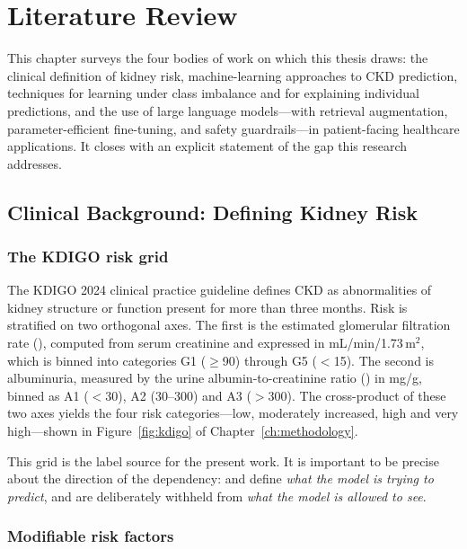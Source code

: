 \chapter{Literature Review}
\label{ch:literature}

This chapter surveys the four bodies of work on which this thesis draws: the
clinical definition of kidney risk, machine-learning approaches to CKD
prediction, techniques for learning under class imbalance and for explaining
individual predictions, and the use of large language models---with retrieval
augmentation, parameter-efficient fine-tuning, and safety guardrails---in
patient-facing healthcare applications. It closes with an explicit statement of
the gap this research addresses.

\section{Clinical Background: Defining Kidney Risk}
\label{sec:clinical}

\subsection{The KDIGO risk grid}

The KDIGO 2024 clinical practice guideline \cite{kdigo2024} defines CKD as
abnormalities of kidney structure or function present for more than three
months. Risk is stratified on two orthogonal axes. The first is the estimated
glomerular filtration rate (\eGFR), computed from serum creatinine and
expressed in mL/min/1.73\,m$^2$, which is binned into categories G1 ($\geq$90)
through G5 ($<$15). The second is albuminuria, measured by the urine
albumin-to-creatinine ratio (\UACR) in mg/g, binned as A1 ($<$30), A2 (30--300)
and A3 ($>$300). The cross-product of these two axes yields the four risk
categories---low, moderately increased, high and very high---shown in
Figure~\ref{fig:kdigo} of Chapter~\ref{ch:methodology}.

This grid is the label source for the present work. It is important to be
precise about the direction of the dependency: \eGFR{} and \UACR{} define
\emph{what the model is trying to predict}, and are deliberately withheld from
\emph{what the model is allowed to see}.

\subsection{Modifiable risk factors}

